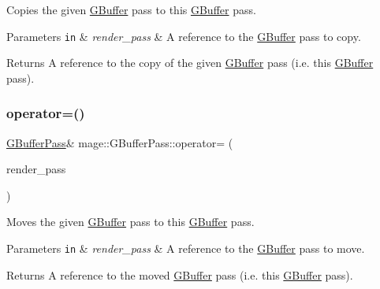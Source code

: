 Copies the given \hyperlink{structmage_1_1_g_buffer}{G\+Buffer} pass to this \hyperlink{structmage_1_1_g_buffer}{G\+Buffer} pass.


\begin{DoxyParams}[1]{Parameters}
\mbox{\tt in}  & {\em render\+\_\+pass} & A reference to the \hyperlink{structmage_1_1_g_buffer}{G\+Buffer} pass to copy. \\
\hline
\end{DoxyParams}
\begin{DoxyReturn}{Returns}
A reference to the copy of the given \hyperlink{structmage_1_1_g_buffer}{G\+Buffer} pass (i.\+e. this \hyperlink{structmage_1_1_g_buffer}{G\+Buffer} pass). 
\end{DoxyReturn}
\hypertarget{classmage_1_1_g_buffer_pass_ace14aafdd028f12296b3fabf1e36ca02}{}\label{classmage_1_1_g_buffer_pass_ace14aafdd028f12296b3fabf1e36ca02} 
\subsubsection{\texorpdfstring{operator=()}{operator=()}\hspace{0.1cm}{\footnotesize\ttfamily [2/2]}}
{\footnotesize\ttfamily \hyperlink{classmage_1_1_g_buffer_pass}{G\+Buffer\+Pass}\& mage\+::\+G\+Buffer\+Pass\+::operator= (\begin{DoxyParamCaption}\item[{\hyperlink{classmage_1_1_g_buffer_pass}{G\+Buffer\+Pass} \&\&}]{render\+\_\+pass }\end{DoxyParamCaption})\hspace{0.3cm}{\ttfamily [delete]}}

Moves the given \hyperlink{structmage_1_1_g_buffer}{G\+Buffer} pass to this \hyperlink{structmage_1_1_g_buffer}{G\+Buffer} pass.


\begin{DoxyParams}[1]{Parameters}
\mbox{\tt in}  & {\em render\+\_\+pass} & A reference to the \hyperlink{structmage_1_1_g_buffer}{G\+Buffer} pass to move. \\
\hline
\end{DoxyParams}
\begin{DoxyReturn}{Returns}
A reference to the moved \hyperlink{structmage_1_1_g_buffer}{G\+Buffer} pass (i.\+e. this \hyperlink{structmage_1_1_g_buffer}{G\+Buffer} pass). 
\end{DoxyReturn}
\hypertarget{classmage_1_1_g_buffer_pass_abd4c5154aefd3d8e9befdb572b37f40d}{}\label{classmage_1_1_g_buffer_pass_abd4c5154aefd3d8e9befdb572b37f40d} 
